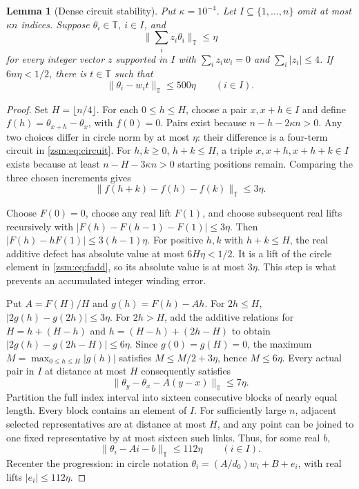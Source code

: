 \documentclass[11pt]{article}
\newtheorem{lemma}[theorem]{Lemma}
\theoremstyle{definition}\newtheorem{definition}[theorem]{Definition}
\theoremstyle{remark}\newtheorem{remark}[theorem]{Remark}
\newcommand{\T}{\mathbb T}
\newcommand{\normT}[1]{\lVert #1\rVert_{\T}}
\begin{document}
\begin{lemma}[Dense circuit stability]\label{zsm:lem:dense}
Put $\kappa=10^{-4}$. Let $I\subseteq\{1,\ldots,n\}$ omit at most
$\kappa n$ indices. Suppose $\theta_i\in\T$, $i\in I$, and
\begin{equation}\label{zsm:eq:circuit}
 \normT{\sum_i z_i\theta_i}\le\eta
\end{equation}
for every integer vector $z$ supported in $I$ with
$\sum_i z_iw_i=0$ and $\sum_i|z_i|\le4$. If $6n\eta<1/2$, there is $t\in\T$
such that
\begin{equation}\label{zsm:eq:denseconclusion}
 \normT{\theta_i-w_it}\le500\eta\qquad(i\in I).
\end{equation}
\end{lemma}
\begin{proof}
Set $H=\lfloor n/4\rfloor$. For each $0\le h\le H$, choose a pair
$x,x+h\in I$ and define $f(h)=\theta_{x+h}-\theta_x$, with $f(0)=0$.
Pairs exist because $n-h-2\kappa n>0$. Any two choices differ in circle norm by
at most $\eta$: their difference is a four-term circuit in \eqref{zsm:eq:circuit}.
For $h,k\ge0$, $h+k\le H$, a triple $x,x+h,x+h+k\in I$ exists because at
least $n-H-3\kappa n>0$ starting positions remain. Comparing the three chosen
increments gives
\begin{equation}\label{zsm:eq:fadd}
 \normT{f(h+k)-f(h)-f(k)}\le3\eta.
\end{equation}

Choose $F(0)=0$, choose any real lift $F(1)$, and choose subsequent real lifts
recursively with $|F(h)-F(h-1)-F(1)|\le3\eta$. Then
$|F(h)-hF(1)|\le3(h-1)\eta$. For positive $h,k$ with $h+k\le H$, the real
additive defect has absolute value at most $6H\eta<1/2$. It is a lift of the
circle element in \eqref{zsm:eq:fadd}, so its absolute value is at most $3\eta$.
This step is what prevents an accumulated integer winding error.

Put $A=F(H)/H$ and $g(h)=F(h)-Ah$. For $2h\le H$,
$|2g(h)-g(2h)|\le3\eta$. For $2h>H$, add the additive relations for
$H=h+(H-h)$ and $h=(H-h)+(2h-H)$ to obtain
$|2g(h)-g(2h-H)|\le6\eta$. Since $g(0)=g(H)=0$, the maximum
$M=\max_{0\le h\le H}|g(h)|$ satisfies $M\le M/2+3\eta$, hence
$M\le6\eta$. Every actual pair in $I$ at distance at most $H$ consequently
satisfies
\[
 \normT{\theta_y-\theta_x-A(y-x)}\le7\eta.
\]
Partition the full index interval into sixteen consecutive blocks of nearly
equal length. Every block contains an element of $I$. For sufficiently large
$n$, adjacent selected representatives are at distance at most $H$, and any
point can be joined to one fixed representative by at most sixteen such links.
Thus, for some real $b$,
\[
 \normT{\theta_i-Ai-b}\le112\eta\qquad(i\in I).
\]
Recenter the progression: in circle notation
$\theta_i=(A/d_0)w_i+B+e_i$, with real lifts $|e_i|\le112\eta$.


\end{proof}
\end{document}
